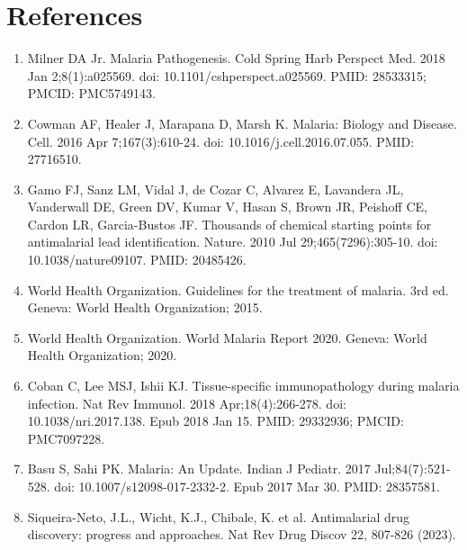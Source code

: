 \documentclass[twoside]{article}
\begin{document}
\section*{References}
\begin{enumerate}
    \item Milner DA Jr. Malaria Pathogenesis. Cold Spring Harb Perspect Med. 2018 Jan 2;8(1):a025569. doi: 10.1101/cshperspect.a025569. PMID: 28533315; PMCID: PMC5749143.
    \item Cowman AF, Healer J, Marapana D, Marsh K. Malaria: Biology and Disease. Cell. 2016 Apr 7;167(3):610-24. doi: 10.1016/j.cell.2016.07.055. PMID: 27716510.
    \item Gamo FJ, Sanz LM, Vidal J, de Cozar C, Alvarez E, Lavandera JL, Vanderwall DE, Green DV, Kumar V, Hasan S, Brown JR, Peishoff CE, Cardon LR, Garcia-Bustos JF. Thousands of chemical starting points for antimalarial lead identification. Nature. 2010 Jul 29;465(7296):305-10. doi: 10.1038/nature09107. PMID: 20485426.
    \item World Health Organization. Guidelines for the treatment of malaria. 3rd ed. Geneva: World Health Organization; 2015.
    \item World Health Organization. World Malaria Report 2020. Geneva: World Health Organization; 2020.
    \item Coban C, Lee MSJ, Ishii KJ. Tissue-specific immunopathology during malaria infection. Nat Rev Immunol. 2018 Apr;18(4):266-278. doi: 10.1038/nri.2017.138. Epub 2018 Jan 15. PMID: 29332936; PMCID: PMC7097228.
    \item Basu S, Sahi PK. Malaria: An Update. Indian J Pediatr. 2017 Jul;84(7):521-528. doi: 10.1007/s12098-017-2332-2. Epub 2017 Mar 30. PMID: 28357581. 
    \item Siqueira-Neto, J.L., Wicht, K.J., Chibale, K. et al. Antimalarial drug discovery: progress and approaches. Nat Rev Drug Discov 22, 807-826 (2023). 
\end{enumerate}
\end{document}
